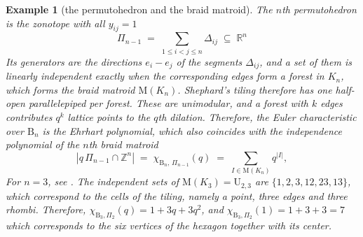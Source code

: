 \documentclass[11pt,a4paper,reqno]{amsart}
\theoremstyle{results}
\theoremstyle{definitions}
\newtheorem{example}[thm]{Example}
\def\Z{\mathbb{Z}}
\def\R{\mathbb{R}}
\def\Z{\mathbb{Z}}
\newcommand{\abs}[1]{\left\lvert#1\right\rvert}
\newcommand{\B}{\textrm{B}}
\newcommand{\M}{\mathrm{M}}
\newcommand{\U}{\mathrm{U}}
\begin{document}
\begin{example}[the permutohedron and the braid matroid]\label{ex:permutohedron}
  The $n$th permutohedron is the zonotope with all $y_{ij} = 1$
  \[
    \Pi_{n-1} \;=\; \sum_{1 \leqslant i < j \leqslant n} \Delta_{ij} \;\subseteq\; \R^{n}
  \]
  Its generators are the directions $e_i - e_j$ of the segments $\Delta_{ij}$, and a set of them is linearly
  independent exactly when the corresponding edges form a forest in $K_n$, which forms the braid matroid $\M(K_n)$.  Shephard's tiling
  therefore has one half-open parallelepiped per forest.  These are unimodular,
  and a forest with $k$ edges contributes $q^{k}$ lattice points to the $q$th dilation. Therefore, the Euler characteristic over $\B_n$ is the
  Ehrhart polynomial, which also coincides with the independence polynomial of the $n$th braid matroid
  \[
    \abs{q\,\Pi_{n-1} \cap \Z^{n}} \;=\; \chi_{\B_n,\, \Pi_{n-1}}(q)
    \;=\; \sum_{I \in \M(K_n)} q^{\abs{I}},
  \]
  For $n = 3$, see . The independent sets of $\M(K_3) = \U_{2,3}$ are $\{1, 2, 3, 12, 23, 13\}$, which correspond to the
  cells of the tiling, namely a point, three edges and three rhombi.  Therefore,
  $\chi_{\B_3, \Pi_2}(q) = 1 + 3q + 3q^2$, and $\chi_{\B_3, \Pi_2}(1) =  1 + 3 + 3 = 7$ which corresponds to the six vertices of the hexagon together with its center.
\end{example}
\end{document}
